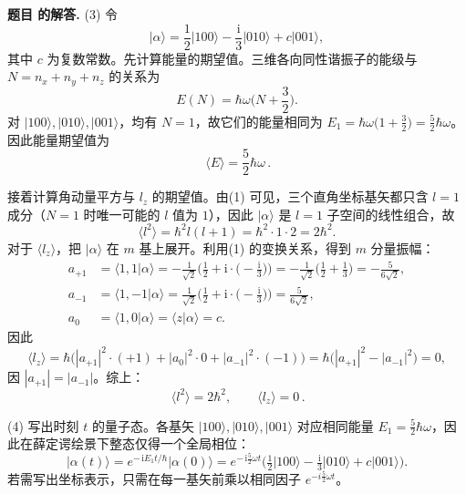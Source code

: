 \documentclass[12pt, a4paper, oneside]{ctexart}
\newcounter{problemname}
\newenvironment{solution}
  {\par\noindent\textbf{题目 \theproblemname 的解答. }}
  {\par}
\begin{document}
\begin{solution}
(3) 令
\[
\lvert\alpha\rangle=\frac{1}{2}\lvert100\rangle-\frac{\mathrm i}{3}\lvert010\rangle + c\lvert001\rangle,
\]
其中 $c$ 为复数常数。先计算能量的期望值。三维各向同性谐振子的能级与 $N=n_x+n_y+n_z$ 的关系为
\[
E(N)=\hbar\omega\Big(N+\frac{3}{2}\Big).
\]
对 $\lvert100\rangle,\lvert010\rangle,\lvert001\rangle$，均有 $N=1$，故它们的能量相同为 $E_1=\hbar\omega\big(1+\tfrac32\big)=\tfrac52\hbar\omega$。因此能量期望值为
\[
\boxed{\,\langle E\rangle=\frac{5}{2}\hbar\omega\,.}
\]

接着计算角动量平方与 $l_z$ 的期望值。由(1) 可见，三个直角坐标基矢都只含 $l=1$ 成分（$N=1$ 时唯一可能的 $l$ 值为 $1$），因此 $\lvert\alpha\rangle$ 是 $l=1$ 子空间的线性组合，故
\[
\langle l^2\rangle=\hbar^2 l(l+1)=\hbar^2\cdot 1\cdot2=2\hbar^2.
\]
对于 $\langle l_z\rangle$，把 $\lvert\alpha\rangle$ 在 $m$ 基上展开。利用(1) 的变换关系，得到 $m$ 分量振幅：
\[
\begin{aligned}
a_{+1}&=\langle 1,1\vert\alpha\rangle
=-\frac{1}{\sqrt2}\Big(\frac{1}{2}+ \mathrm i\cdot\big(-\frac{\mathrm i}{3}\big)\Big)
=-\frac{1}{\sqrt2}\Big(\frac{1}{2}+\frac{1}{3}\Big)
=-\frac{5}{6\sqrt2},\\[4pt]
a_{-1}&=\langle 1,-1\vert\alpha\rangle
=\frac{1}{\sqrt2}\Big(\frac{1}{2}+\mathrm i\cdot\big(-\frac{\mathrm i}{3}\big)\Big)
=\frac{5}{6\sqrt2},\\[4pt]
a_{0}&=\langle 1,0\vert\alpha\rangle=\langle z\vert\alpha\rangle=c.
\end{aligned}
\]
因此
\[
\langle l_z\rangle=\hbar\big( |a_{+1}|^2\cdot(+1)+|a_0|^2\cdot 0 + |a_{-1}|^2\cdot(-1)\big)
=\hbar\big(|a_{+1}|^2-|a_{-1}|^2\big)=0,
\]
因 $|a_{+1}|=|a_{-1}|$。综上：
\[
\boxed{\,\langle l^2\rangle=2\hbar^2,\qquad \langle l_z\rangle=0\,.}
\]

(4) 写出时刻 $t$ 的量子态。各基矢 $\lvert100\rangle,\lvert010\rangle,\lvert001\rangle$ 对应相同能量 $E_1=\tfrac52\hbar\omega$，因此在薛定谔绘景下整态仅得一个全局相位：
\[
\lvert\alpha(t)\rangle=e^{-\,\mathrm i E_1 t/\hbar}\lvert\alpha(0)\rangle
=e^{-\,\mathrm i\frac{5}{2}\omega t}\Big(\tfrac12\lvert100\rangle-\tfrac{\mathrm i}{3}\lvert010\rangle + c\lvert001\rangle\Big).
\]
若需写出坐标表示，只需在每一基矢前乘以相同因子 $e^{-i\frac52\omega t}$。
\end{solution}
\end{document}
